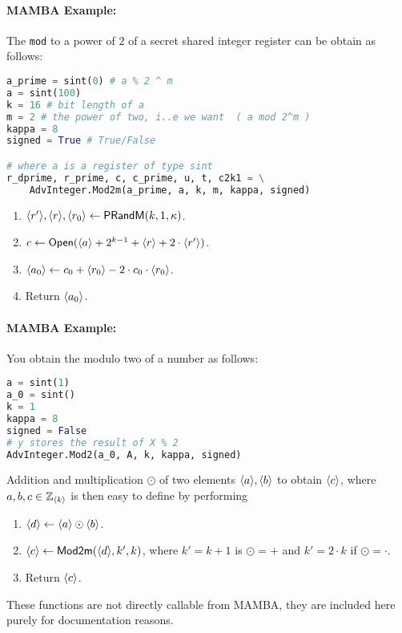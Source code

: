 \paragraph{MAMBA Example:} The \verb|mod| to a power of $2$ of a secret shared integer register can be obtain as follows: 
\begin{lstlisting}[language={python}]
a_prime = sint(0) # a % 2 ^ m
a = sint(100)
k = 16 # bit length of a
m = 2 # the power of two, i..e we want  ( a mod 2^m )
kappa = 8 
signed = True # True/False

# where a is a register of type sint
r_dprime, r_prime, c, c_prime, u, t, c2k1 = \
    AdvInteger.Mod2m(a_prime, a, k, m, kappa, signed)
\end{lstlisting}


\begin{enumerate}
\item $\langle r' \rangle, \langle r \rangle, \langle r_0 \rangle \leftarrow \mathsf{PRandM}(k,1,\kappa)$.
\item $c \leftarrow {\mathsf{Open}}(\langle a \rangle+2^{k-1}+\langle r \rangle+2 \cdot \langle r' \rangle)$.
\item $\langle a_0 \rangle \leftarrow c_0+\langle r_0 \rangle-2 \cdot c_0 \cdot \langle r_0 \rangle$.
\item Return $\langle a_0 \rangle$.
\end{enumerate}

\paragraph{MAMBA Example:} You obtain the modulo two of a number as follows:
\begin{lstlisting}[language={python}]
a = sint(1)
a_0 = sint()
k = 1
kappa = 8
signed = False
# y stores the result of X % 2
AdvInteger.Mod2(a_0, A, k, kappa, signed)
\end{lstlisting}

Addition and multiplication $\odot$ of two elements $\langle a \rangle, \langle b \rangle$
to obtain $\langle c \rangle$, where $a,b,c \in {\mathbb{Z}}_{\langle k \rangle}$ is then easy to define
by performing
\begin{enumerate}
\item $\langle d \rangle \leftarrow \langle a \rangle \odot \langle b \rangle$.
\item $\langle c \rangle \leftarrow \mathsf{Mod2m}(\langle d \rangle,k',k)$,
        where $k'=k+1$ is $\odot=+$ and $k'=2\cdot k$ if $\odot=\cdot$.
\item Return $\langle c \rangle$.
\end{enumerate}
These functions are not directly callable from MAMBA, they are
included here purely for documentation reasons.

